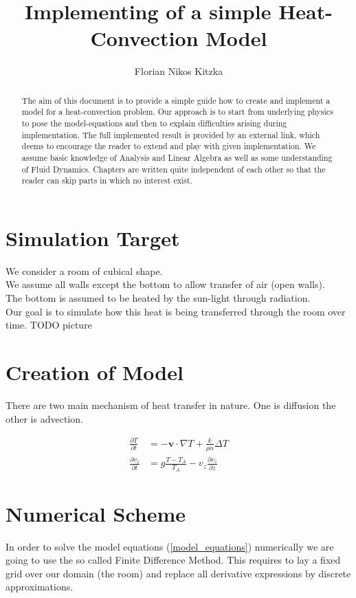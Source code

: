 \documentclass[]{article}
\title{Implementing of a simple Heat-Convection Model}
\author{Florian Nikos Kitzka}
\begin{document}
\maketitle

\begin{abstract}
The aim of this document is to provide a simple guide how to create and implement a model for a heat-convection problem. Our approach is to start from underlying physics to pose the model-equations and then to explain difficulties arising during implementation.
The full implemented result is provided by an external link, which deems to encourage the reader to extend and play with given implementation.
We assume basic knowledge of Analysis and Linear Algebra as well as some understanding of 
Fluid Dynamics. Chapters are written quite independent of each other so that the reader
can skip parts in which no interest exist. 
\end{abstract}

\tableofcontents

\section{Simulation Target}
We consider a room of cubical shape.\\
We assume all walls except the bottom to allow transfer of air (open walls).\\
The bottom is assumed to be heated by the sun-light through radiation.\\
Our goal is to simulate how this heat is being transferred through the room over time.
TODO picture

\section{Creation of Model}
There are two main mechanism of heat transfer in nature. One is diffusion the other is advection.


\begin{align} 
\frac{\partial T}{\partial t}&=-\textbf{v}\cdot \nabla T + \frac{k}{\rho\alpha}\Delta T \label{model_equations} \\
\frac{\partial v_{z}}{\partial t}&=g\frac{T-T_{A}}{T_{A}}-v_{z}\frac{\partial v_{z}}{\partial z} \nonumber
\end{align}

\section{Numerical Scheme}
In order to solve the model equations (\ref{model_equations}) numerically we are going to use the so called Finite Difference Method. This requires to lay a fixed grid over our domain (the room) and replace all derivative expressions by discrete approximations.
\end{document}
